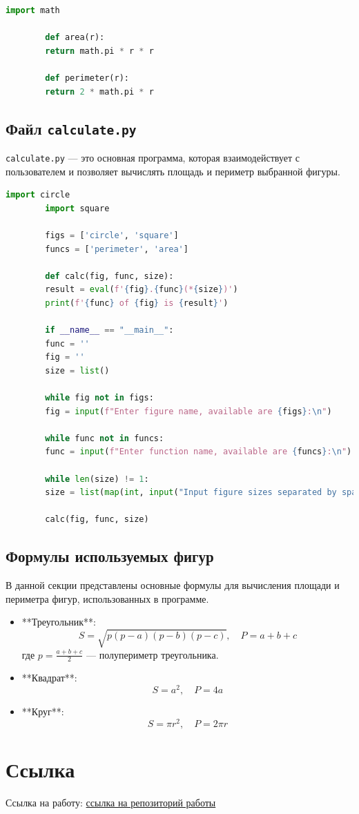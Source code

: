 \documentclass[a4paper, 14pt]{extarticle}
\begin{document}
	\begin{lstlisting}[language=Python]
		import math
		
		def area(r):
		return math.pi * r * r
		
		def perimeter(r):
		return 2 * math.pi * r
	\end{lstlisting}
	
	\newpage
	\subsection{Файл \texttt{calculate.py}}
	\texttt{calculate.py} — это основная программа, которая взаимодействует с пользователем и позволяет вычислять площадь и периметр выбранной фигуры.
	\begin{lstlisting}[language=Python]
		import circle
		import square
		
		figs = ['circle', 'square']
		funcs = ['perimeter', 'area']
		
		def calc(fig, func, size):
		result = eval(f'{fig}.{func}(*{size})')
		print(f'{func} of {fig} is {result}')
		
		if __name__ == "__main__": 
		func = ''
		fig = ''
		size = list()
		
		while fig not in figs:
		fig = input(f"Enter figure name, available are {figs}:\n")
		
		while func not in funcs:
		func = input(f"Enter function name, available are {funcs}:\n")
		
		while len(size) != 1:
		size = list(map(int, input("Input figure sizes separated by space, 1 for circle and square\n").split(' ')))
		
		calc(fig, func, size)
	\end{lstlisting}
	
	\newpage
	\subsection{Формулы используемых фигур}
	В данной секции представлены основные формулы для вычисления площади и периметра фигур, использованных в программе.
	
	\begin{itemize}
		\item **Треугольник**:
		\[
		S = \sqrt{p(p - a)(p - b)(p - c)}, \quad P = a + b + c
		\]
		где \(p = \frac{a + b + c}{2}\) — полупериметр треугольника.
		
		\item **Квадрат**:
		\[
		S = a^2, \quad P = 4a
		\]
		
		\item **Круг**:
		\[
		S = \pi r^2, \quad P = 2\pi r
		\]
	\end{itemize}
	
	\newpage
	\section{Ссылка}
	Ссылка на работу:
	\href{https://github.com/Alexandr-prog34/Laba-ISRPO-3}{ссылка на репозиторий работы}
	
\end{document}
